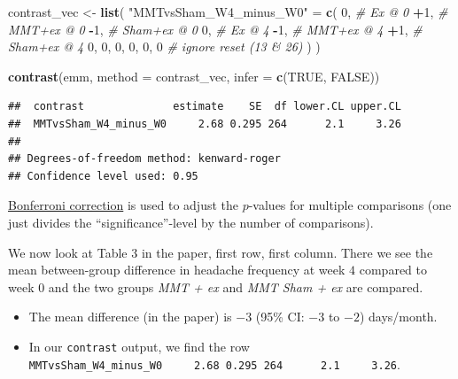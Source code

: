 \documentclass[
]{article}
\newenvironment{Shaded}{\begin{snugshade}}{\end{snugshade}}
\newcommand{\AttributeTok}[1]{\textcolor[rgb]{0.13,0.29,0.53}{#1}}
\newcommand{\CommentTok}[1]{\textcolor[rgb]{0.56,0.35,0.01}{\textit{#1}}}
\newcommand{\ConstantTok}[1]{\textcolor[rgb]{0.56,0.35,0.01}{#1}}
\newcommand{\DecValTok}[1]{\textcolor[rgb]{0.00,0.00,0.81}{#1}}
\newcommand{\FunctionTok}[1]{\textcolor[rgb]{0.13,0.29,0.53}{\textbf{#1}}}
\newcommand{\NormalTok}[1]{#1}
\newcommand{\OtherTok}[1]{\textcolor[rgb]{0.56,0.35,0.01}{#1}}
\newcommand{\SpecialCharTok}[1]{\textcolor[rgb]{0.81,0.36,0.00}{\textbf{#1}}}
\newcommand{\StringTok}[1]{\textcolor[rgb]{0.31,0.60,0.02}{#1}}
\providecommand{\tightlist}{%
  \setlength{\itemsep}{0pt}\setlength{\parskip}{0pt}}
\begin{document}
\begin{Shaded}
\begin{Highlighting}[]
\NormalTok{contrast\_vec }\OtherTok{\textless{}{-}} \FunctionTok{list}\NormalTok{(}
  \StringTok{"MMTvsSham\_W4\_minus\_W0"} \OtherTok{=} \FunctionTok{c}\NormalTok{(}
    \DecValTok{0}\NormalTok{,   }\CommentTok{\# Ex @ 0}
    \SpecialCharTok{+}\DecValTok{1}\NormalTok{,  }\CommentTok{\# MMT+ex @ 0}
    \SpecialCharTok{{-}}\DecValTok{1}\NormalTok{,  }\CommentTok{\# Sham+ex @ 0}
    \DecValTok{0}\NormalTok{,   }\CommentTok{\# Ex @ 4}
    \SpecialCharTok{{-}}\DecValTok{1}\NormalTok{,  }\CommentTok{\# MMT+ex @ 4}
    \SpecialCharTok{+}\DecValTok{1}\NormalTok{,  }\CommentTok{\# Sham+ex @ 4}
    \DecValTok{0}\NormalTok{, }\DecValTok{0}\NormalTok{, }\DecValTok{0}\NormalTok{, }\DecValTok{0}\NormalTok{, }\DecValTok{0}\NormalTok{, }\DecValTok{0} \CommentTok{\# ignore reset (13 \& 26)}
\NormalTok{  )}
\NormalTok{)}

\FunctionTok{contrast}\NormalTok{(emm, }\AttributeTok{method =}\NormalTok{ contrast\_vec, }\AttributeTok{infer =} \FunctionTok{c}\NormalTok{(}\ConstantTok{TRUE}\NormalTok{, }\ConstantTok{FALSE}\NormalTok{))}
\end{Highlighting}
\end{Shaded}

\begin{verbatim}
##  contrast              estimate    SE  df lower.CL upper.CL
##  MMTvsSham_W4_minus_W0     2.68 0.295 264      2.1     3.26
## 
## Degrees-of-freedom method: kenward-roger 
## Confidence level used: 0.95
\end{verbatim}

\href{https://en.wikipedia.org/wiki/Bonferroni_correction}{Bonferroni
correction} is used to adjust the \(p\)-values for multiple comparisons
(one just divides the ``significance''-level by the number of
comparisons).

We now look at Table 3 in the paper, first row, first column. There we
see the mean between-group difference in headache frequency at week
\(4\) compared to week \(0\) and the two groups \emph{MMT + ex} and
\emph{MMT Sham + ex} are compared.

\begin{itemize}
\tightlist
\item
  The mean difference (in the paper) is \(-3\) (95\% CI: \(-3\) to
  \(-2\)) days/month.
\item
  In our \texttt{contrast} output, we find the row
  \texttt{MMTvsSham\_W4\_minus\_W0\ \ \ \ \ 2.68\ 0.295\ 264\ \ \ \ \ \ 2.1\ \ \ \ \ 3.26}.
\end{itemize}
\end{document}
